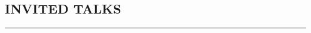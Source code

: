 \documentclass[10pt,letter]{article}
\begin{document}
\begin{small}
 






\subsection*{INVITED TALKS}
\hrule
\vspace{0.2cm}


\end{small}
\end{document}
